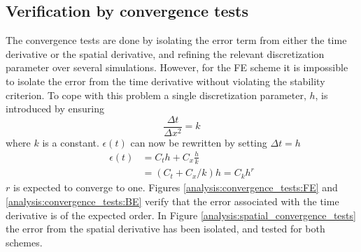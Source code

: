 \subsection{Verification by convergence tests}

The convergence tests are done by isolating the error term from either the time derivative or the spatial derivative, and refining the relevant discretization parameter over several simulations. 
However, for the FE scheme it is impossible to isolate the error from the time derivative without violating the stability criterion. 
To cope with this problem a single discretization parameter, $h$, is introduced by ensuring  
\begin{equation*}
 \frac{\Delta t}{\Delta x^2} = k
\end{equation*}
where $k$ is a constant. 
$\epsilon(t)$ can now be rewritten by setting $\Delta t = h$
\begin{align*}
 \epsilon(t) &= C_t h + C_x\frac{h}{k} \\
 &= (C_t +C_x/k)h = C_k h^r
\end{align*}
$r$ is expected to converge to one. 
Figures \ref{analysis:convergence_tests:FE} and \ref{analysis:convergence_tests:BE} verify that the error associated with the time derivative is of the expected order. 
In Figure \ref{analysis:spatial_convergence_tests} the error from the spatial derivative has been isolated, and tested for both schemes. 

